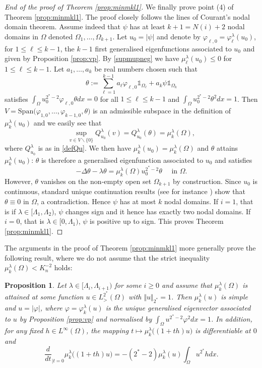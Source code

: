 \documentclass[10pt]{amsart}
\numberwithin{equation}{section}
\newcommand{\vp}{\varphi}
\newcommand{\Om}{\Omega}
\newcommand{\mkl}{\mu_{k}^{\lambda}}
\theoremstyle{plain}
\newtheorem{prop}{Proposition}[section]%
\theoremstyle{remark}
\begin{document}
\begin{proof}[End of the proof of Theorem \ref{prop:minmkl1}]
\medskip

We finally prove point (4) of Theorem \ref{prop:minmkl1}. The proof closely follows the lines of Courant's nodal domain theorem. Assume indeed that $\psi$ has at least $k+1 = N(i)+2$ nodal domains in $\Om$ denoted $\Omega_1, \dots, \Omega_{k+1}$. Let $u_0 = |\psi|$ and denote by $\vp_{\ell,0} = \vp_\ell^{\lambda}(u_0)$, for $1 \le \ell \le k-1$, the $k-1$ first generalised eigenfunctions associated to $u_0$ and given by Proposition \ref{prop:vp}. By \eqref{supmupneg} we have $\mu_\ell^{\lambda}(u_0) \le0$ for $1 \le \ell \le k-1$. Let $a_1, \dots, a_{k}$ be real numbers chosen such that 
 $$ \theta:= \sum_{\ell=1}^{k-1} a_\ell \vp_{\ell,0} \mathds{1}_{\Omega_\ell} + a_{k} \psi \mathds{1}_{\Omega_{k}}  $$
 satisfies $\int_{\Om} u_0^{2^*-2} \vp_{\ell,0}\theta dx = 0$ for all $1 \le \ell \le k-1$ and $\int_{\Om} u_0^{2^*-2} \theta^2 dx = 1$. Then $V = \text{Span} \big( \vp_{1,0}, \dots, \vp_{k-1,0}, \theta)$ is an admissible subspace in the definition of $\mu_{k}^{\lambda}(u_0)$ and we easily see that 
 $$ \sup_{v \in V \backslash \{0\}} Q_{u_0}^{\lambda}(v) = Q_{u_0}^{\lambda}(\theta) = \mu_{k}^{\lambda}(\Om), $$
 where $Q_{u_0}^{\lambda}$ is as in \eqref{defQu}. We then have $\mu_{k}^{\lambda}(u_0)  = \mu_{k}^{\lambda}(\Om)$ and $\theta$ attains $\mu_{k}^{\lambda}(u_0)$: $\theta$ is therefore a generalised eigenfunction associated to $u_0$ and satisfies 
 $$ - \Delta \theta - \lambda \theta = \mu_{k}^{\lambda}(\Om) u_0^{2^*-2} \theta \quad \text{ in } \Om. $$
 However, $\theta$ vanishes on the non-empty open set $\Om_{k+1}$ by construction. Since $u_0$ is continuous, standard unique continuation results (see for instance \cite{Aronszajn}) show that $\theta \equiv 0$ in $\Om$, a contradiction. Hence $\psi$ has at most $k$ nodal domains. If $i=1$, that is if $\lambda \in [\Lambda_1, \Lambda_{2})$, $\psi$ changes sign and it hence has exactly two nodal domains. If $i=0$, that is $\lambda \in [0, \Lambda_1)$, $\psi$ is positive up to sign. This proves Theorem \ref{prop:minmkl1}. 
  \end{proof}
  
The arguments in the proof of Theorem \ref{prop:minmkl1} more generally prove the following result, where we do not assume that the strict inequality $\mkl(\Om) < K_n^{-2}$ holds: 
  \begin{prop} \label{prop:extremales}
Let $\lambda \in [\Lambda_i, \Lambda_{i+1})$ for some $i \ge 0$ and assume that $\mkl(\Om)$ is attained at some function $u \in L^{2^*}_{>}(\Om) $ with  $\Vert u \Vert_{2^*} = 1$. Then $\mkl(u)$ is simple and $u = |\vp|$, where $\vp = \vp_k^{\lambda}(u)$ is the unique generalised eigenvector associated to $u$ by Proposition \ref{prop:vp} and normalised by $\int_{\Om} u^{2^*-2} \vp^2dx = 1$. In addition, for any fixed $h \in L^\infty(\Om)$, the mapping $t \mapsto \mkl \big((1+th)u \big)$ is differentiable at $0$ and 
$$ \frac{d}{dt}_{|t=0}  \mkl \big((1+th)u \big) = - (2^*-2) \mkl(u) \int_{\Om} u^{2^*} h dx.$$
  \end{prop}
  
\end{document}
